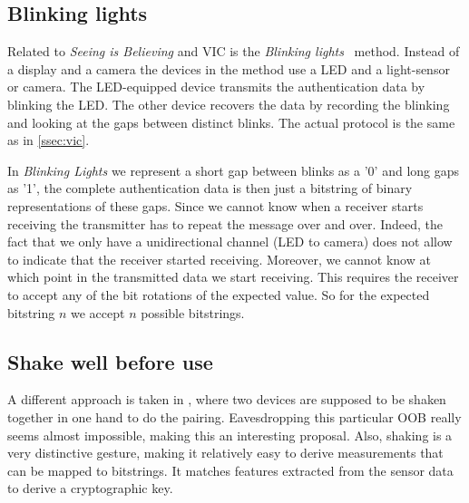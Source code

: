 \documentclass[conference, 11pt]{sty/IEEEtran}
\begin{document}



\subsection{Blinking lights}
Related to \textit{Seeing is Believing} and VIC is the \textit{Blinking lights}~\cite{saxena2006secure} method.
Instead of a display and a camera the devices in the method use a LED and a light-sensor or camera.
The LED-equipped device transmits the authentication data by blinking the LED.
The other device recovers the data by recording the blinking and looking at the gaps between distinct blinks.
The actual protocol is the same as in \autoref{ssec:vic}.

In \emph{Blinking Lights} we represent a short gap between blinks as a '0' and long gaps as '1', the complete authentication data is then just a bitstring of binary representations of these gaps.
Since we cannot know when a receiver starts receiving the transmitter has to repeat the message over and over.
Indeed, the fact that we only have a unidirectional channel (LED to camera) does not allow to indicate that the receiver started receiving.
Moreover, we cannot know at which point in the transmitted data we start receiving.
This requires the receiver to accept any of the bit rotations of the expected value.
So for the expected bitstring $n$ we accept $n$ possible bitstrings.

\subsection{Shake well before use}
A different approach is taken in \cite{mayrhofer2009shake}, where two devices are supposed to be shaken together in one hand to do the pairing.
Eavesdropping this particular OOB really seems almost impossible, making this an interesting proposal.
Also, shaking is a very distinctive gesture, making it relatively easy to derive measurements that can be mapped to bitstrings.
It matches features extracted from the sensor data to derive a cryptographic key.
\end{document}
